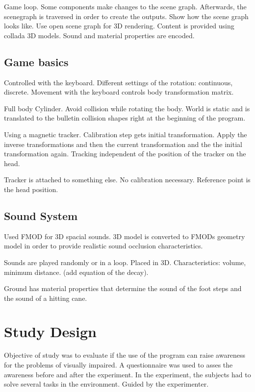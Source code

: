 \documentclass{sig-alternate}
\begin{document}
Game loop. Some components make changes to the scene graph. Afterwards, the
scenegraph is traversed in order to create the outputs. Show how the scene graph
looks like. Use open scene graph for 3D rendering. Content is provided using
collada 3D models. Sound and material properties are encoded.

\subsection{Game basics}

Controlled with the keyboard. Different settings of the rotation: continuous,
discrete. Movement with the keyboard controls body transformation matrix.

Full body Cylinder. Avoid collision while rotating the body. World is static and
is translated to the bulletin collision shapes right at the beginning of the
program.

Using a magnetic tracker. Calibration step gets initial transformation. Apply
the inverse transformations and then the current transformation and the the
initial transformation again. Tracking independent of the position of the
tracker on the head.

Tracker is attached to something else. No calibration necessary. Reference
point is the head position.

\subsection{Sound System}

Used FMOD for 3D spacial sounds. 3D model is converted to FMODs geometry model
in order to provide realistic sound occlusion characteristics.

Sounds are played randomly or in a loop. Placed in 3D. Characteristics: volume,
minimum distance. (add equation of the decay).

Ground has material properties that determine the sound of the foot steps and
the sound of a hitting cane.

\section{Study Design}

Objective of study was to evaluate if the use of the program can raise awareness
for the problems of visually impaired. A questionnaire was used to asses the
awareness before and after the experiment. In the experiment, the subjects had
to solve several tasks in the environment. Guided by the experimenter.
\end{document}
